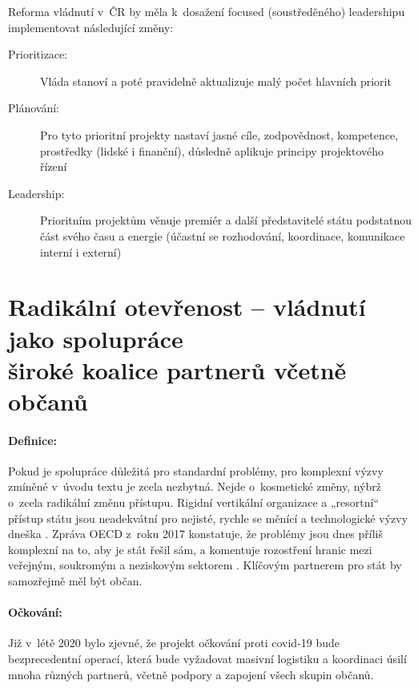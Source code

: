 Reforma vládnutí v~ČR by měla k~dosažení focused (soustředěného) leadershipu
implementovat následující změny:
\begin{description}
  \item[Prioritizace:] Vláda stanoví a poté pravidelně aktualizuje malý počet hlavních priorit
  \item[Plánování:] Pro tyto prioritní projekty nastaví jasné cíle, zodpovědnost, kompetence, prostředky (lidské i finanční), důsledně aplikuje principy projektového řízení
  \item[Leadership:] Prioritním projektům věnuje premiér a další představitelé státu podstatnou část svého času a energie (účastní se rozhodování, koordinace, komunikace interní i externí)
\end{description}

\section*{Radikální otevřenost -- vládnutí jako spolupráce \\ široké koalice partnerů včetně občanů}

\paragraph{Definice:}Pokud je spolupráce důležitá pro standardní problémy, pro komplexní výzvy zmíněné v~úvodu textu je zcela nezbytná. Nejde o~kosmetické změny, nýbrž o~zcela radikální změnu přístupu. Rigidní vertikální organizace a „resortní“ přístup státu jsou neadekvátní pro nejisté, rychle se měnící a technologické výzvy dneška \cite{d_eggers_future_2020}. Zpráva OECD z~roku 2017 konstatuje, že problémy jsou dnes příliš komplexní na to, aby je stát řešil sám, a komentuje rozostření hranic mezi veřejným, soukromým a neziskovým sektorem \cite{oecd_public_governance_reviews_skills_2020}. Klíčovým partnerem pro stát by samozřejmě měl být občan.

\paragraph{Očkování:} Již v~létě 2020 bylo zjevné, že projekt očkování proti covid-19 bude bezprecedentní operací, která bude vyžadovat masivní logistiku a koordinaci úsilí mnoha různých partnerů, včetně podpory a zapojení všech skupin občanů.

